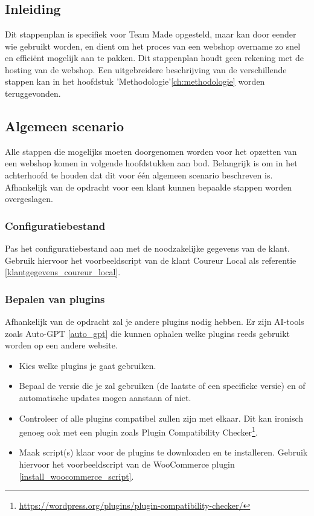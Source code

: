 
\chapter{}%
\label{ch:stappenplan}

\section{Inleiding}
Dit stappenplan is specifiek voor Team Made opgesteld, maar kan door eender wie gebruikt worden, en dient om het proces van een webshop overname zo snel en efficiënt mogelijk aan te pakken. Dit stappenplan houdt geen rekening met de hosting van de webshop. Een uitgebreidere beschrijving van de verschillende stappen kan in het hoofdstuk 'Methodologie'\ref{ch:methodologie} worden teruggevonden.  
\section{Algemeen scenario}
Alle stappen die mogelijks moeten doorgenomen worden voor het opzetten van een webshop komen in volgende hoofdstukken aan bod. Belangrijk is om in het achterhoofd te houden dat dit voor één algemeen scenario beschreven is. Afhankelijk van de opdracht voor een klant kunnen bepaalde stappen worden overgeslagen.
\subsection{Configuratiebestand}
Pas het configuratiebestand aan met de noodzakelijke gegevens van de klant. Gebruik hiervoor het voorbeeldscript van de klant Coureur Local als referentie \ref{klantgegevens_coureur_local}.
\subsection{Bepalen van plugins}
Afhankelijk van de opdracht zal je andere plugins nodig hebben. Er zijn AI-tools zoals Auto-GPT \ref{auto_gpt} die kunnen ophalen welke plugins reeds gebruikt worden op een andere website.
\begin{itemize}
    \item Kies welke plugins je gaat gebruiken. 
    \item Bepaal de versie die je zal gebruiken (de laatste of een specifieke versie) en of automatische updates mogen aanstaan of niet.
    \item Controleer of alle plugins compatibel zullen zijn met elkaar. Dit kan ironisch genoeg ook met een plugin zoals Plugin Compatibility Checker\footnote{\href{https://wordpress.org/plugins/plugin-compatibility-checker/}{https://wordpress.org/plugins/plugin-compatibility-checker/}}.
    \item Maak script(s) klaar voor de plugins te downloaden en te installeren. Gebruik hiervoor het voorbeeldscript van de WooCommerce plugin \ref{install_woocommerce_script}.
\end{itemize}

